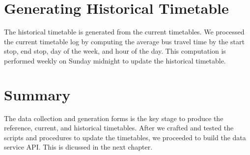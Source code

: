 \section{Generating Historical Timetable}
\label{sec:historical_timetable}
\par The historical timetable is generated from the current timetables. We processed the current timetable log by computing the average bus travel time by the start stop, end stop, day of the week, and hour of the day. This computation is performed weekly on Sunday midnight to update the historical timetable.


\section{Summary}
\par The data collection and generation forms is the key stage to produce the reference, current, and historical timetables. After we crafted and tested the scripts and procedures to update the timetables, we proceeded to build the data service API. This is dicussed in the next chapter.
